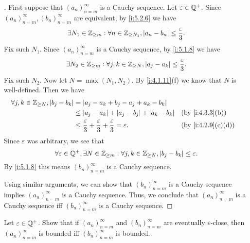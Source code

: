 \begin{proof}[]
  First suppose that \((a_n)_{n = m}^\infty\) is a Cauchy sequence.
  Let \(\varepsilon \in \mathbb{Q}^+\).
  Since \((a_n)_{n = m}^\infty, (b_n)_{n = m}^\infty\) are equivalent, by \cref{i:5.2.6} we have
  \[
    \exists N_1 \in \mathbb{Z}_{\geq m} : \forall n \in \mathbb{Z}_{\geq N_1}, \left\lvert a_n - b_n\right\rvert \leq \dfrac{\varepsilon}{3}.
  \]
  Fix such \(N_1\).
  Since \((a_n)_{n = m}^\infty\) is a Cauchy sequence, by \cref{i:5.1.8} we have
  \[
    \exists N_2 \in \mathbb{Z}_{\geq m} : \forall j, k \in \mathbb{Z}_{\geq N}, \left\lvert a_j - a_k\right\rvert \leq \dfrac{\varepsilon}{3}.
  \]
  Fix such \(N_2\).
  Now let \(N = \max(N_1, N_2)\).
  By \cref{i:4.1.11}(f) we know that \(N\) is well-defined.
  Then we have
  \begin{align*}
    \forall j, k \in \Z_{\geq N}, \abs{b_j - b_k} & = \abs{a_j - a_k + b_j - a_j + a_k - b_k}                                                                           \\
                                                  & \leq \abs{a_j - a_k} + \abs{a_j - b_j} + \abs{a_k - b_k}                                     &  & \by{i:4.3.3}[b]   \\
                                                  & \leq \dfrac{\varepsilon}{3} + \dfrac{\varepsilon}{3} + \dfrac{\varepsilon}{3} = \varepsilon. &  & \by{i:4.2.9}[c,d]
  \end{align*}
  Since \(\varepsilon\) was arbitrary, we see that
  \[
    \forall \varepsilon \in \mathbb{Q}^+, \exists N \in \mathbb{Z}_{\geq m} : \forall j, k \in \mathbb{Z}_{\geq N}, \left\lvert b_j - b_k\right\rvert \leq \varepsilon.
  \]
  By \cref{i:5.1.8} this means \((b_n)_{n = m}^\infty\) is a Cauchy sequence.

  Using similar arguments, we can show that \((b_n)_{n = m}^\infty\) is a Cauchy sequence implies \((a_n)_{n = m}^\infty\) is a Cauchy sequence.
  Thus, we conclude that \((a_n)_{n = m}^\infty\) is a Cauchy sequence iff \((b_n)_{n = m}^\infty\) is a Cauchy sequence.
\end{proof}

\begin{ex}\label{i:ex:5.2.2}
  Let \(\varepsilon \in \mathbb{Q}^+\).
  Show that if \((a_n)_{n = m}^{\infty}\) and \((b_n)_{n = m}^{\infty}\) are eventually \(\varepsilon\)-close, then \((a_n)_{n = m}^{\infty}\) is bounded iff \((b_n)_{n = m}^{\infty}\) is bounded.
\end{ex}

